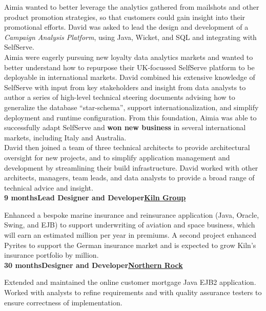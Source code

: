 \documentclass[a4paper,12pt]{article}
\newcommand{\clientwork}[3]{\textbf{#1\hfill#3\hfill#2}\nopagebreak}
\begin{document}
Aimia wanted to better leverage the analytics gathered from mailshots and other product promotion strategies, so that customers could gain insight into their promotional efforts. David was asked to lead the design and development of a \emph{Campaign Analysis Platform}, using Java, Wicket, and SQL and integrating with SelfServe.\\

Aimia were eagerly pursuing new loyalty data analytics markets and wanted to better understand how to repurpose their UK-focussed SelfServe platform to be deployable in international markets. David combined his extensive knowledge of SelfServe with input from key stakeholders and insight from data analysts to author a series of high-level technical steering documents advising how to generalize the database ``star-schema'', support internationalization, and simplify deployment and runtime configuration. From this foundation, Aimia was able to successfully adapt SelfServe and \textbf{won new business} in several international markets, including Italy and Australia.\\

David then joined a team of three technical architects to provide architectural oversight for new projects, and to simplify application management and development by streamlining their build infrastructure. David worked with other architects, managers, team leads, and data analysts to provide a broad range of technical advice and insight.\\

\clientwork{9 months}{\href{http://kilngroup.com/}{Kiln Group}}{Lead Designer and Developer}

Enhanced a bespoke marine insurance and reinsurance application (Java, Oracle, Swing, and EJB) to support underwriting of aviation and space business, which will earn an estimated  million per year in premiums. A second project enhanced Pyrites to support the German insurance market and is expected to grow  Kiln's insurance portfolio by  million.\\

\clientwork{30 months}{\href{http://www.northernrock.co.uk}{Northern Rock}}{Designer and Developer}

Extended and maintained the online customer mortgage Java EJB2 application. Worked with analysts to refine requirements and with quality assurance testers to ensure correctness of implementation.\\
\end{document}
